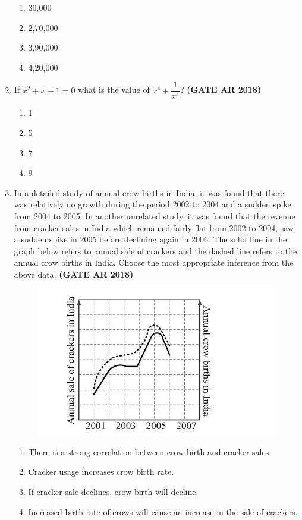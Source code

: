 \documentclass[journal,15pt,onecolumn]{IEEEtran}
\theoremstyle{remark}
\begin{document}
\begin{enumerate}
\begin{enumerate}
\item    30,000
 \item   2,70,000
 \item   3,90,000
 \item   4,20,000 
\end{enumerate}


 \item 
If $x^2 + x - 1 = 0$ what is the value of $x^4 + \dfrac{1}{x^4}$?\hfill \textbf{ (GATE AR 2018)}

\begin{enumerate}
    \item 1
    \item  5
    \item 7
    \item 9
\end{enumerate}


\item 
In a detailed study of annual crow births in India, it was found that there was relatively no growth during the period 2002 to 2004 and a sudden spike from 2004 to 2005. In another unrelated study, it was found that the revenue from cracker sales in India which remained fairly flat from 2002 to 2004, saw a sudden spike in 2005 before declining again in 2006. The solid line in the graph below refers to annual sale of crackers and the dashed line refers to the annual crow births in India. Choose the most appropriate inference from the above data.\hfill \textbf{ (GATE AR 2018)}

\begin{figure}[H]
    \centering
    \includegraphics[width=0.5\linewidth]{figs/10i.png}
    \caption{}
    \label{fig:placeholder}
\end{figure}





\begin{enumerate}

\item    There is a strong correlation between crow birth and cracker sales.
\item   Cracker usage increases crow birth rate. 
\item    If cracker sale declines, crow birth will decline. 
\item   Increased birth rate of crows will cause an increase in the sale of crackers.
\end{enumerate}




\end{enumerate}
\end{document}
